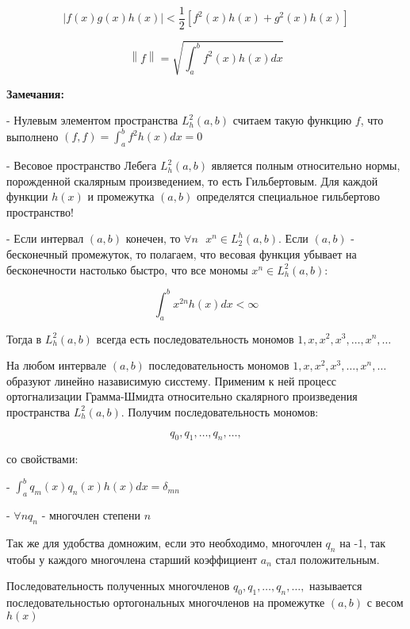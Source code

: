 \documentclass[12pt, a4paper]{report}
\begin{document}
\[ \left\lvert f(x ) g(x )h(x )\right\rvert < \frac{1}{2 }  [f ^2 (x )h(x ) + g ^2 (x ) h(x )] \] 

\[ \left\lVert  f  \right\rVert = \sqrt{\int_{a }^{b } f ^2 ( x )h (x ) dx } \] 

\textbf{Замечания: } 

- Нулевым элементом пространства \( L^2 _h (a,b) \)  считаем такую функцию \( f  \), что выполнено \(\displaystyle  (f,f   ) = \int_{ a }^{b } f ^2 h( x )dx = 0  \) 

- Весовое пространство Лебега \( L^2 _h (a,b) \)  является полным относительно нормы, порожденной скалярным произведением, то есть Гильбертовым. Для каждой функции \( h (x ) \) и промежутка \( (a, b) \) определятся специальное гильбертово пространство! 

- Если интервал \( (a,b) \)  конечен, то \( \forall  n \text{ }  x^{n }  \in  L^ h _ 2 (a,b ). \) Если \( (a,b ) \) - бесконечный промежуток, то полагаем, что весовая функция убывает на бесконечности настолько быстро, что все мономы \( x^ n \in  L^2 _h (a,b ) \): 

\[ \int_{a }^{b } x^{2n } h(x )dx < \infty  \] 

Тогда в \( L^2 _h (a,b ) \) всегда есть последовательность мономов \( 1,x , x ^2, x ^3, \ldots, x^n, \ldots  \) 

На любом интервале \( (a,b ) \) последовательность мономов \(1,x , x ^2, x ^3, \ldots, x^n, \ldots  \) образуют линейно назависимую сисстему. Применим к ней  процесс ортогнализации Грамма-Шмидта относительно скалярного произведения пространства \( L^2 _h (a,b ) \). Получим последовательность мономов: 

\[ q_0,q_1, \ldots, q_n, \ldots,  \] 

со свойствами:

- \( \displaystyle  \int_{a }^{b } q_m (x ) q_n (x )h(x )dx = \delta _{mn}  \) 

- \( \forall  n q_n  \) - многочлен степени \( n \) 

Так же для удобства домножим, если это необходимо, многочлен \( q_n  \) на -1, так чтобы у каждого многочлена старший коэффициент \( a_n  \) стал положительным. 

\begin{definition}
    Последовательность полученных многочленов \( q_0,q_1, \ldots, q_n, \ldots,   \) называется последовательностью ортогональных многочленов на промежутке \( (a,b ) \) с весом \( h (x ) \)
\end{definition}
\end{document}
